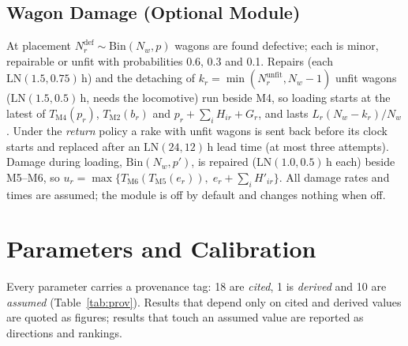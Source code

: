 \subsection{Wagon Damage (Optional Module)}
At placement $N^{\text{def}}_r \sim \mathrm{Bin}(N_w, p)$ wagons are found defective; each is minor, repairable or unfit with probabilities 0.6, 0.3 and 0.1. Repairs (each $\mathrm{LN}(1.5, 0.75)$\,h) and the detaching of $k_r = \min(N^{\text{unfit}}_r, N_w - 1)$ unfit wagons ($\mathrm{LN}(1.5, 0.5)$\,h, needs the locomotive) run beside M4, so loading starts at the latest of $T_{\mathrm{M4}}(p_r)$, $T_{\mathrm{M2}}(b_r)$ and $p_r + \sum_i H_{ir} + G_r$, and lasts $L_r (N_w - k_r)/N_w$. Under the \emph{return} policy a rake with unfit wagons is sent back before its clock starts and replaced after an $\mathrm{LN}(24, 12)$\,h lead time (at most three attempts). Damage during loading, $\mathrm{Bin}(N_w, p')$, is repaired ($\mathrm{LN}(1.0, 0.5)$\,h each) beside M5--M6, so $u_r = \max\{T_{\mathrm{M6}}(T_{\mathrm{M5}}(e_r)),\; e_r + \sum_i H'_{ir}\}$. All damage rates and times are assumed; the module is off by default and changes nothing when off.

\section{Parameters and Calibration}
\label{sec:params}
Every parameter carries a provenance tag: 18 are \emph{cited}, 1 is \emph{derived} and 10 are \emph{assumed} (Table~\ref{tab:prov}). Results that depend only on cited and derived values are quoted as figures; results that touch an assumed value are reported as directions and rankings.

